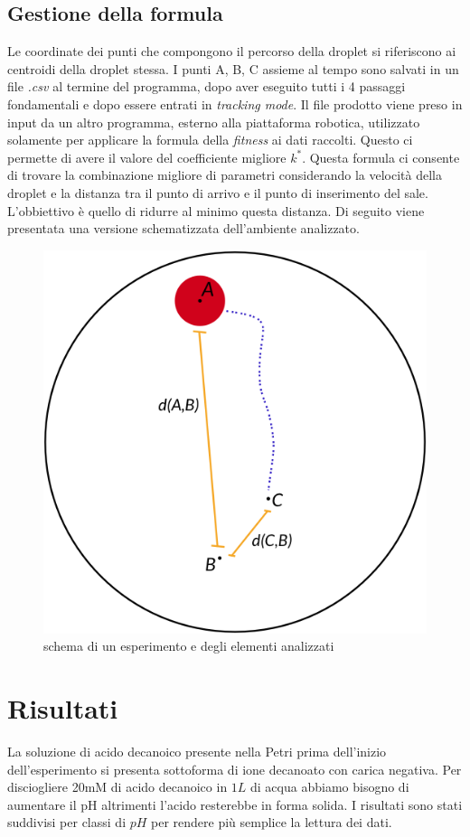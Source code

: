 \subsection{Gestione della formula}
Le coordinate dei punti che compongono il percorso della droplet si riferiscono ai centroidi della droplet stessa. I punti A, B, C assieme al tempo sono salvati in un file \emph{.csv} al termine del programma, dopo aver eseguito tutti i 4 passaggi fondamentali e dopo essere entrati in \emph{tracking mode}. Il file prodotto viene preso in input da un altro programma, esterno alla piattaforma robotica, utilizzato solamente per applicare la formula della \emph{fitness} ai dati raccolti. Questo ci permette di avere il valore del coefficiente migliore $k^*$. Questa formula ci consente di trovare la combinazione migliore di parametri considerando la velocità della droplet e la distanza tra il punto di arrivo e il punto di inserimento del sale. L'obbiettivo è quello di ridurre al minimo questa distanza. Di seguito viene presentata una versione schematizzata dell'ambiente analizzato.
 \begin{figure}[h]
	  \includegraphics[scale=0.30]{immagini/schema.png}
		\centering
	 \caption{schema di un esperimento e degli elementi analizzati}
\end{figure} 
\pagebreak
\section{Risultati}
La soluzione di acido decanoico presente nella Petri prima dell'inizio dell'esperimento si presenta sottoforma di ione decanoato con carica negativa. Per disciogliere 20mM di acido decanoico in $1L$ di acqua abbiamo bisogno di aumentare il pH altrimenti l'acido resterebbe in forma solida. I risultati sono stati suddivisi per classi di $pH$ per rendere più semplice la lettura dei dati.
